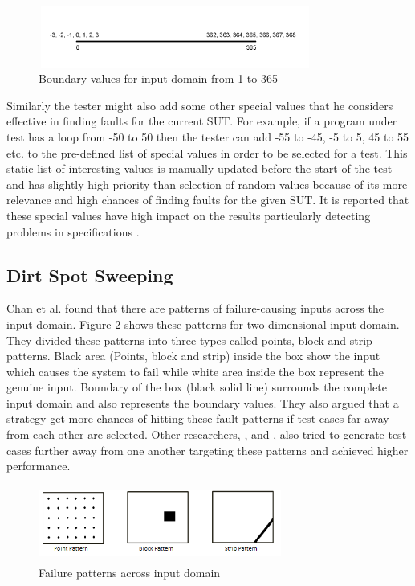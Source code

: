 \documentclass[conference]{IEEEtran}
\begin{document}
\begin{figure}[ht]
\centering
\includegraphics[width= 9cm,height=2cm]{boundary.png}
\caption{Boundary values for input domain from 1 to 365}
\label{fig:boundaryValues}
\end{figure}

Similarly the tester might also add some other special values that he considers effective in finding faults for the current SUT. For example, if a program under test has a loop from -50 to 50 then the tester can add -55 to -45, -5 to 5, 45 to 55 etc. to the pre-defined list of special values in order to be selected for a test. This static list of interesting values is manually updated before the start of the test and has slightly high priority than selection of random values because of its more relevance and high chances of finding faults for the given SUT. It is reported that these special values have high impact on the results particularly detecting problems in specifications \cite{Ciupa2008}.

\subsection{Dirt Spot Sweeping}
Chan et al. \cite{Chan1996} found that there are patterns of failure-causing inputs across the input domain. Figure \ref{fig:patterns} shows these patterns for two dimensional input domain. They divided these patterns into three types called points, block and strip patterns. Black area (Points, block and strip) inside the box show the input which causes the system to fail while white area inside the box represent the genuine input. Boundary of the box (black solid line) surrounds the complete input domain and also represents the boundary values. They also argued that a strategy get more chances of hitting these fault patterns if test cases far away from each other are selected. Other researchers, \cite{Chan2002}, \cite{Chen2003} and \cite{Chen2005}, also tried to generate test cases further away from one another targeting these patterns and achieved higher performance.\\
\begin{figure}[ht]                                    
\centering
\includegraphics[width= 8cm,height=2.5cm]{ART_Patterns.png}
\caption{Failure patterns across input domain \cite{Chen2008}}
\label{fig:patterns}
\end{figure}
\end{document}
